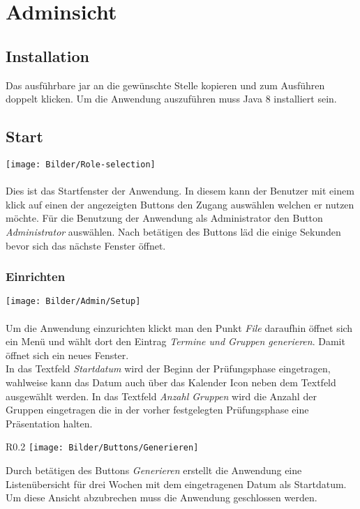 \section{Adminsicht}

\subsection{Installation}
Das ausführbare jar an die gewünschte Stelle kopieren und zum Ausführen doppelt klicken.
Um die Anwendung auszuführen muss Java 8 installiert sein. 

\subsection{Start}
	\texttt{[image: Bilder/Role-selection]}
	\\
	\\
Dies ist das Startfenster der Anwendung. In diesem kann der Benutzer mit einem klick auf einen der angezeigten Buttons den Zugang auswählen welchen er nutzen möchte. Für die Benutzung der Anwendung als Administrator den Button \textit{Administrator} auswählen. Nach betätigen des Buttons läd die einige Sekunden bevor sich das nächste Fenster öffnet.



\subsubsection{Einrichten}
	\texttt{[image: Bilder/Admin/Setup]}
	\\
	\\
Um die Anwendung einzurichten klickt man den Punkt \textit{File} daraufhin öffnet sich ein Menü und wählt dort den Eintrag \textit{Termine und Gruppen generieren}. Damit öffnet sich ein neues Fenster. \\In das Textfeld \textit{Startdatum} wird der Beginn der Prüfungsphase eingetragen, wahlweise kann das Datum auch über das Kalender Icon neben dem Textfeld ausgewählt werden. In das Textfeld \textit{Anzahl Gruppen} wird die Anzahl der Gruppen eingetragen die in der vorher festgelegten Prüfungsphase eine Präsentation halten. 
\\
\begin{wrapfigure}{R}{0.2\textwidth}
	\centering
	\texttt{[image: Bilder/Buttons/Generieren]}
\end{wrapfigure}

Durch betätigen des Buttons \textit{Generieren} erstellt die Anwendung eine Listenübersicht für drei Wochen mit dem eingetragenen Datum als Startdatum. Um diese Ansicht abzubrechen muss die Anwendung geschlossen werden.



